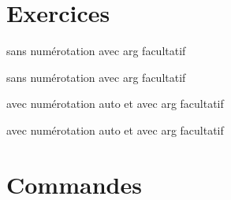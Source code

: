 \documentclass[french,10pt]{book}
\begin{document}
\section{Exercices}

\begin{Exo}
sans numérotation avec arg facultatif
\end{Exo}

\begin{Exo}[15 p 152]
sans numérotation avec arg facultatif
\end{Exo}

\begin{Exercice}
avec numérotation auto et avec arg facultatif
\end{Exercice}

\begin{Exercice}
avec numérotation auto et avec arg facultatif
\end{Exercice}

\section{Commandes}
\end{document}
